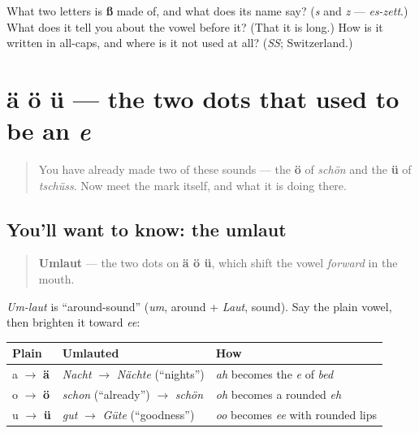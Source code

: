 \begin{tcolorbox}[breakable,colback=teal!4,colframe=teal!35!black,title={Before you move on}]
What two letters is \textbf{ß} made of, and what does its name say? (\emph{s} and \emph{z} — \emph{es-zett}.) What does it tell you about the vowel before it? (That it is long.) How is it written in all-caps, and where is it not used at all? (\emph{SS}; Switzerland.)
\end{tcolorbox}
\section[ä ö ü]{ä ö ü — the two dots that used to be an \emph{e}}

\label{lesson:GE-W02-umlauts}



\begin{quote}
You have already made two of these sounds — the \textbf{ö} of \emph{schön} and the \textbf{ü} of \emph{tschüss}. Now meet the mark itself, and what it is doing there.
\end{quote}

\subsection*{You'll want to know: the umlaut}
\begin{quote}
\textbf{Umlaut} — the two dots on \textbf{ä ö ü}, which shift the vowel \emph{forward} in the mouth.
\end{quote}

\emph{Um-laut} is \textquotedblleft{}around-sound\textquotedblright{} (\emph{um}, around + \emph{Laut}, sound). Say the plain vowel, then brighten it toward \emph{ee}:

\noindent
\begin{tabularx}{\linewidth}{@{}>{\raggedright\arraybackslash}X>{\raggedright\arraybackslash}X>{\raggedright\arraybackslash}X@{}}
\toprule
\textbf{Plain} & \textbf{Umlauted} & \textbf{How} \\
\midrule
a $\to$ \textbf{ä} & \emph{Nacht} $\to$ \emph{Nächte} (\textquotedblleft{}nights\textquotedblright{}) & \emph{ah} becomes the \emph{e} of \emph{bed} \\
o $\to$ \textbf{ö} & \emph{schon} (\textquotedblleft{}already\textquotedblright{}) $\to$ \emph{schön} & \emph{oh} becomes a rounded \emph{eh} \\
u $\to$ \textbf{ü} & \emph{gut} $\to$ \emph{Güte} (\textquotedblleft{}goodness\textquotedblright{}) & \emph{oo} becomes \emph{ee} with rounded lips \\
\bottomrule
\end{tabularx}

